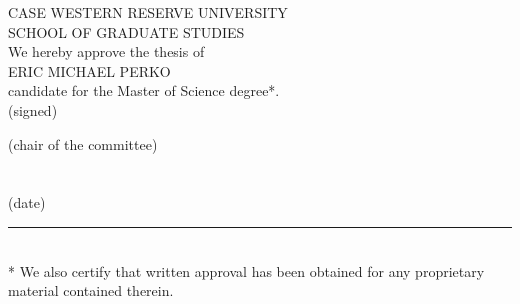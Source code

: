 \thispagestyle{empty}
\begin{doublespace}
	\begin{center}
		{ \large CASE WESTERN RESERVE UNIVERSITY }\\[0.5in]
		{ \large SCHOOL OF GRADUATE STUDIES }\\[0.5in]
		
		We hereby approve the thesis of
		\\[0.3in]
		ERIC MICHAEL PERKO
		\\[0.3in]
		candidate for the Master of Science degree*.
		\\[0.5in]

		(signed)\hrulefill
		
		(chair of the committee)\\[0.5in]

		\hrulefill\\[0.5in]
		
		\hrulefill\\[0.5in]
		
		(date)\rule{0.5\textwidth}{0.4pt}\\[0.3in]

		* We also certify that written approval has been obtained for any proprietary material contained therein.

	\end{center}
\end{doublespace}